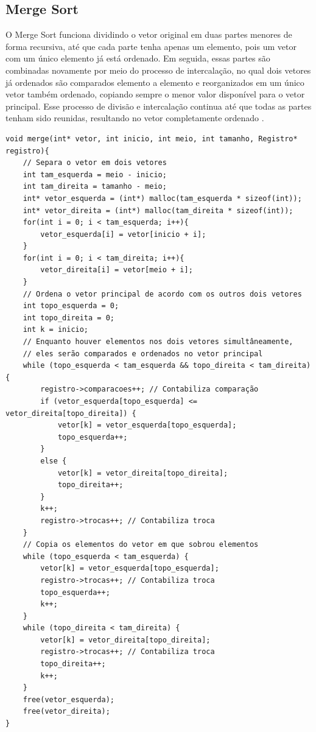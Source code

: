 \documentclass[12pt]{article}
\begin{document}
\subsection{Merge Sort}

O Merge Sort funciona dividindo o vetor original em duas partes menores de forma recursiva, até que cada parte tenha apenas um elemento, pois um vetor com um único elemento já está ordenado. Em seguida, essas partes são combinadas novamente por meio do processo de intercalação, no qual dois vetores já ordenados são comparados elemento a elemento e reorganizados em um único vetor também ordenado, copiando sempre o menor valor disponível para o vetor principal. Esse processo de divisão e intercalação continua até que todas as partes tenham sido reunidas, resultando no vetor completamente ordenado \cite{cormen2009}.

\begin{lstlisting}
void merge(int* vetor, int inicio, int meio, int tamanho, Registro* registro){
    // Separa o vetor em dois vetores
    int tam_esquerda = meio - inicio;
    int tam_direita = tamanho - meio;
    int* vetor_esquerda = (int*) malloc(tam_esquerda * sizeof(int));	
    int* vetor_direita = (int*) malloc(tam_direita * sizeof(int));	
    for(int i = 0; i < tam_esquerda; i++){
        vetor_esquerda[i] = vetor[inicio + i];
    }
    for(int i = 0; i < tam_direita; i++){
        vetor_direita[i] = vetor[meio + i];
    }
    // Ordena o vetor principal de acordo com os outros dois vetores
    int topo_esquerda = 0;
    int topo_direita = 0;
    int k = inicio;
    // Enquanto houver elementos nos dois vetores simultâneamente, 
    // eles serão comparados e ordenados no vetor principal
    while (topo_esquerda < tam_esquerda && topo_direita < tam_direita) {
        registro->comparacoes++; // Contabiliza comparação
        if (vetor_esquerda[topo_esquerda] <= vetor_direita[topo_direita]) {
            vetor[k] = vetor_esquerda[topo_esquerda];
            topo_esquerda++;
        } 
        else {
            vetor[k] = vetor_direita[topo_direita];
            topo_direita++;
        }
        k++;
        registro->trocas++; // Contabiliza troca
    }
    // Copia os elementos do vetor em que sobrou elementos
    while (topo_esquerda < tam_esquerda) {
        vetor[k] = vetor_esquerda[topo_esquerda];
        registro->trocas++; // Contabiliza troca
        topo_esquerda++;
        k++;
    }
    while (topo_direita < tam_direita) {
        vetor[k] = vetor_direita[topo_direita];
        registro->trocas++; // Contabiliza troca
        topo_direita++;
        k++;
    }
    free(vetor_esquerda);
    free(vetor_direita);
}
\end{lstlisting}
\end{document}
